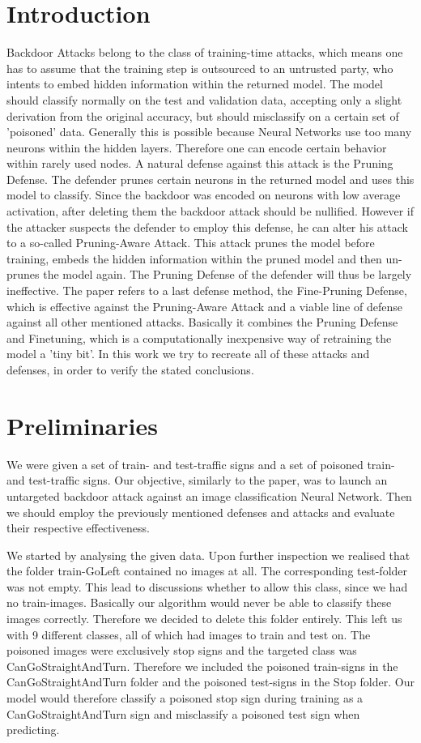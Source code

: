 \documentclass[a4paper,12pt]{article}
\begin{document}
\section{Introduction}
Backdoor Attacks belong to the class of training-time attacks, which means one has to assume that the training step is outsourced to an untrusted party, who intents to embed hidden information within the returned model. The model should classify normally on the test and validation data, accepting only a slight derivation from the original accuracy, but should misclassify on a certain set of 'poisoned' data. Generally this is possible because Neural Networks use too many neurons within the hidden layers. Therefore one can encode certain behavior within rarely used nodes. A natural defense against this attack is the Pruning Defense. The defender prunes certain neurons in the returned model and uses this model to classify. Since the backdoor was encoded on neurons with low average activation, after deleting them the backdoor attack should be nullified. However if the attacker suspects the defender to employ this defense, he can alter his attack to a so-called Pruning-Aware Attack. This attack prunes the model before training, embeds the hidden information within the pruned model and then un-prunes the model again. The Pruning Defense of the defender will thus be largely ineffective. The paper refers to a last defense method, the Fine-Pruning Defense, which is effective against the Pruning-Aware Attack and a viable line of defense against all other mentioned attacks. Basically it combines the Pruning Defense and Finetuning, which is a  computationally inexpensive way of retraining the model a 'tiny bit'. In this work we try to recreate all of these attacks and defenses, in order to verify the stated conclusions.

\section{Preliminaries}
We were given a set of train- and test-traffic signs and a set of poisoned train- and test-traffic signs. Our objective, similarly to the paper, was to launch an untargeted backdoor attack against an image classification Neural Network. Then we should employ the previously mentioned defenses and attacks and evaluate their respective effectiveness.

We started by analysing the given data. Upon further inspection we realised that the folder train-GoLeft contained no images at all. The corresponding test-folder was not empty. This lead to discussions whether to allow this class, since we had no train-images. Basically our algorithm would never be able to classify these images correctly. Therefore we decided to delete this folder entirely. This left us with 9 different classes, all of which had images to train and test on. The poisoned images were exclusively stop signs and the targeted class was CanGoStraightAndTurn. Therefore we included the poisoned train-signs in the CanGoStraightAndTurn folder and the poisoned test-signs in the Stop folder. Our model would therefore classify a poisoned stop sign during training as a CanGoStraightAndTurn sign and misclassify a poisoned test sign when predicting. 
\end{document}

